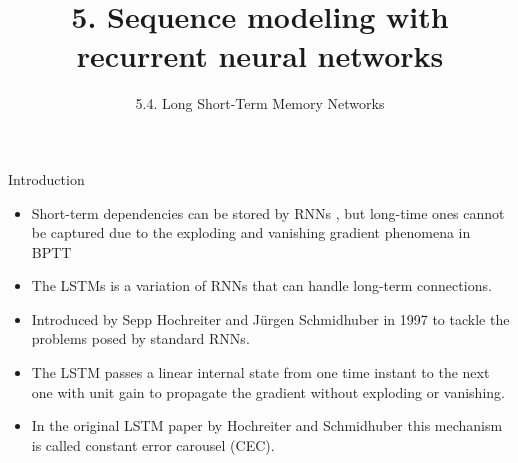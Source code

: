 \documentclass{beamer}
\title{5. Sequence modeling with recurrent neural networks}
\subtitle{5.4. Long Short-Term Memory Networks}
\begin{document}
\maketitle

\begin{frame}{Introduction}
\begin{itemize} 

\item Short-term dependencies can be stored by RNNs , but long-time ones cannot be captured due to the exploding and vanishing gradient phenomena in BPTT 
\item The LSTMs  is a variation of RNNs that can handle long-term connections. 
\item Introduced by Sepp Hochreiter and J\"urgen Schmidhuber in 1997 to tackle the problems posed by standard RNNs.
\item The LSTM passes a linear  internal state from one time instant to the next one with unit gain to propagate the gradient without exploding or vanishing. 
\item In the original LSTM paper by Hochreiter and Schmidhuber this mechanism is called constant error carousel (CEC).  
\end{itemize}
\end{frame}
\end{document}
